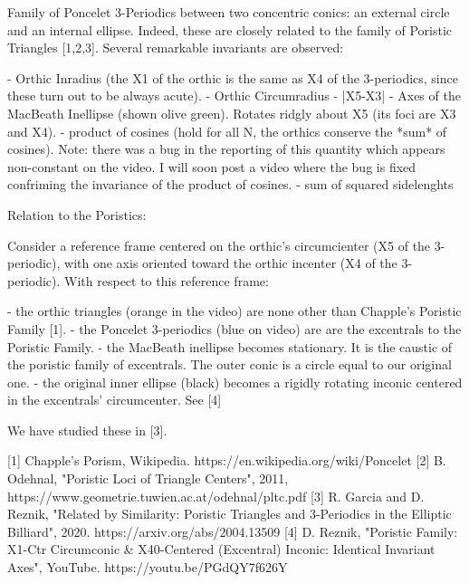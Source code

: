 Family of Poncelet 3-Periodics between two concentric conics: an external circle and an internal ellipse. Indeed, these are closely related to the family of Poristic Triangles [1,2,3]. Several remarkable invariants are observed:

- Orthic Inradius (the X1 of the orthic is the same as X4 of the 3-periodics, since these turn out to be always acute).
- Orthic Circumradius
- |X5-X3|
- Axes of the MacBeath Inellipse (shown olive green). Rotates ridgly about X5 (its foci are X3 and X4).
- product of cosines (hold for all N, the orthics conserve the *sum* of cosines). Note: there was a bug in the reporting of this quantity which appears non-constant on the video. I will soon post a video where the bug is fixed confriming the invariance of the product of cosines.
- sum of squared sidelenghts

Relation to the Poristics:

Consider a reference frame centered on the orthic's circumcienter (X5 of the 3-periodic), with one axis oriented toward the orthic incenter (X4 of the 3-periodic). With respect to this reference frame: 

- the orthic triangles (orange in the video) are none other than Chapple's Poristic Family [1].
- the Poncelet 3-periodics (blue on video) are are the excentrals to the Poristic Family.
- the MacBeath inellipse becomes stationary. It is the caustic of the poristic family of excentrals. The outer conic is a circle equal to our original one.
- the original inner ellipse (black) becomes a rigidly rotating inconic centered in the excentrals' circumcenter. See [4]

We have studied these in [3].

[1] Chapple's Porism, Wikipedia. https://en.wikipedia.org/wiki/Poncelet%
[2] B. Odehnal, "Poristic Loci of Triangle Centers", 2011, https://www.geometrie.tuwien.ac.at/odehnal/pltc.pdf
[3] R. Garcia and D. Reznik, "Related by Similarity:  Poristic Triangles and 3-Periodics in the Elliptic Billiard", 2020. https://arxiv.org/abs/2004.13509
[4] D. Reznik, "Poristic Family: X1-Ctr Circumconic & X40-Centered (Excentral) Inconic: Identical Invariant Axes", YouTube. https://youtu.be/PGdQY7f626Y
